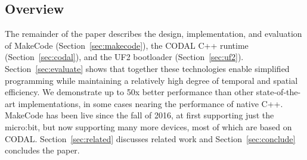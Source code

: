 \subsection{Overview}

The remainder of the paper describes the design, implementation, and evaluation of MakeCode (Section~\ref{sec:makecode}), the CODAL C++ runtime (Section~\ref{sec:codal}), and the UF2 bootloader (Section~\ref{sec:uf2}). Section~\ref{sec:evaluate} shows that together these technologies enable simplified programming while maintaining a relatively high degree of temporal and spatial efficiency. We demonstrate up to 50x better performance than other state-of-the-art implementations, in some cases nearing the performance of native C++. MakeCode has been live since the fall of 2016, at first supporting just the micro:bit, but now supporting many more devices, most of which are based on CODAL. Section~\ref{sec:related} discusses related work and Section~\ref{sec:conclude} concludes the paper.









